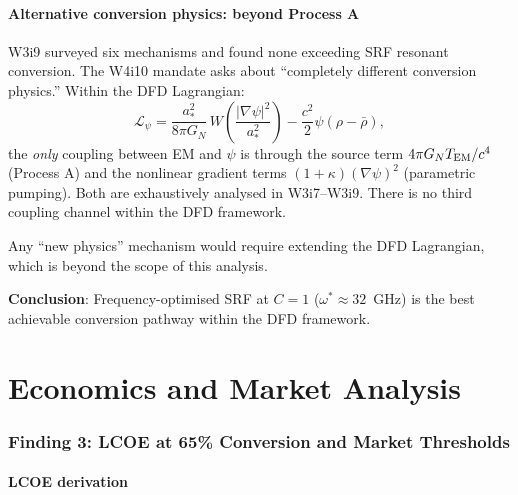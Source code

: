 \documentclass[11pt]{article}
\newcommand{\GN}{G_N}
\begin{document}
\subsection{Alternative conversion physics: beyond Process A}

W3i9 surveyed six mechanisms and found none exceeding SRF resonant
conversion. The W4i10 mandate asks about ``completely different conversion
physics.'' Within the DFD Lagrangian:
\begin{equation}
\mathcal{L}_\psi = \frac{a_*^2}{8\pi \GN}\,W\!\left(
\frac{|\nabla\psi|^2}{a_*^2}\right) - \frac{c^2}{2}\psi(\rho-\bar\rho),
\end{equation}
the \emph{only} coupling between EM and $\psi$ is through the source term
$4\pi\GN T_{\rm EM}/c^4$ (Process A) and the nonlinear gradient terms
$(1+\kappa)(\nabla\psi)^2$ (parametric pumping). Both are exhaustively
analysed in W3i7--W3i9. There is no third coupling channel within the
DFD framework.

Any ``new physics'' mechanism would require extending the DFD Lagrangian,
which is beyond the scope of this analysis.

\textbf{Conclusion}: Frequency-optimised SRF at $C = 1$ ($\omega^* \approx
32$~GHz) is the best achievable conversion pathway within the DFD framework.

\part{Economics and Market Analysis}
\label{part:economics}

\section{Finding 3: LCOE at 65\% Conversion and Market Thresholds}
\label{sec:economics}

\subsection{LCOE derivation}
\end{document}

